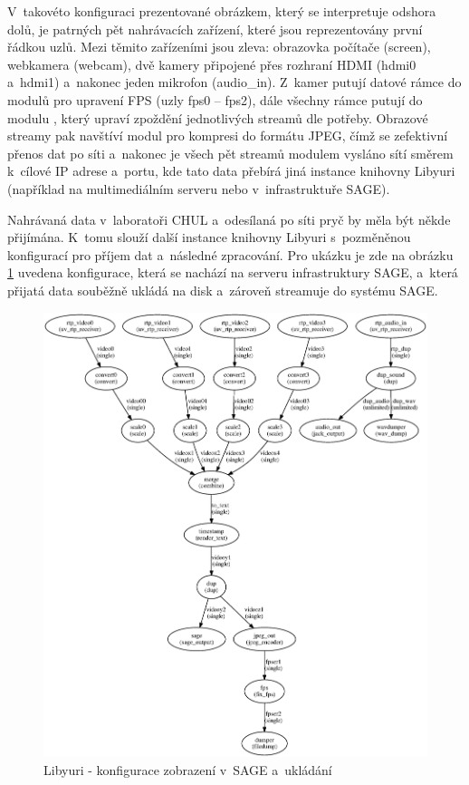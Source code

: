 \documentclass[thesis=M,czech]{FITthesis}[2012/06/26]
\begin{document}
V~takovéto konfiguraci prezentované obrázkem, který se interpretuje odshora dolů, je patrných pět nahrávacích zařízení, které jsou reprezentovány první řádkou uzlů. Mezi těmito zařízeními jsou zleva: obrazovka počítače (screen), webkamera (webcam), dvě kamery připojené přes rozhraní HDMI (hdmi0 a~hdmi1) a~nakonec jeden mikrofon (audio\_in). Z~kamer putují datové rámce do modulů pro upravení FPS (uzly fps0 -- fps2), dále všechny rámce putují do modulu , který upraví zpoždění jednotlivých streamů dle potřeby. Obrazové streamy pak navštíví modul  pro kompresi do formátu JPEG, čímž se zefektivní přenos dat po síti a~nakonec je všech pět streamů modulem  vysláno sítí směrem k~cílové IP adrese a~portu, kde tato data přebírá jiná instance knihovny Libyuri (například na multimediálním serveru nebo v~infrastruktuře SAGE). 

Nahrávaná data v~laboratoři CHUL a~odesílaná po síti pryč by měla být někde přijímána. K~tomu slouží další instance knihovny Libyuri s~pozměněnou konfigurací pro příjem dat a~následné zpracování. Pro ukázku je zde na obrázku \ref{img:navrh_backend_libyuri_receiver} uvedena konfigurace, která se nachází na serveru infrastruktury SAGE, a~která přijatá data souběžně ukládá na disk a~zároveň streamuje do systému SAGE.
\\
\begin{figure}[h]\centering
	\includegraphics[width=1\textwidth]{images/ulab_receiver.eps}
	\caption{Libyuri - konfigurace zobrazení v~SAGE a~ukládání}\label{img:navrh_backend_libyuri_receiver}
\end{figure}
\end{document}
